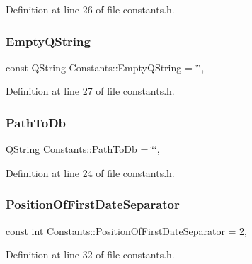Definition at line 26 of file constants.\+h.

\hypertarget{classConstants_a60b54ff297949426391e55991f80ccf2}{}\label{classConstants_a60b54ff297949426391e55991f80ccf2} 
\subsubsection{\texorpdfstring{Empty\+Q\+String}{EmptyQString}}
{\footnotesize\ttfamily const Q\+String Constants\+::\+Empty\+Q\+String = \char`\"{}\char`\"{}\hspace{0.3cm}{\ttfamily [static]}, {\ttfamily [private]}}



Definition at line 27 of file constants.\+h.

\hypertarget{classConstants_a2a8fc008322275c6dfbc1f18a781c405}{}\label{classConstants_a2a8fc008322275c6dfbc1f18a781c405} 
\subsubsection{\texorpdfstring{Path\+To\+Db}{PathToDb}}
{\footnotesize\ttfamily Q\+String Constants\+::\+Path\+To\+Db = \char`\"{}\char`\"{}\hspace{0.3cm}{\ttfamily [static]}, {\ttfamily [private]}}



Definition at line 24 of file constants.\+h.

\hypertarget{classConstants_aeade44a42999a2037171cc8b04031edb}{}\label{classConstants_aeade44a42999a2037171cc8b04031edb} 
\subsubsection{\texorpdfstring{Position\+Of\+First\+Date\+Separator}{PositionOfFirstDateSeparator}}
{\footnotesize\ttfamily const int Constants\+::\+Position\+Of\+First\+Date\+Separator = 2\hspace{0.3cm}{\ttfamily [static]}, {\ttfamily [private]}}



Definition at line 32 of file constants.\+h.

